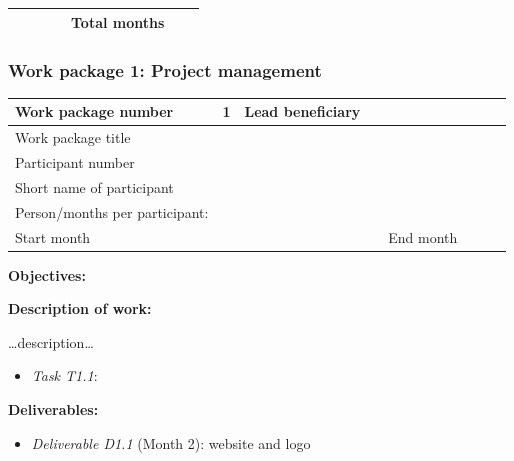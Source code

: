 \documentclass[]{article}
\providecommand{\tightlist}{%
  \setlength{\itemsep}{0pt}\setlength{\parskip}{0pt}}
\begin{document}
\begin{longtable}[]{@{}lllllll@{}}
\begin{minipage}[t]{0.11\columnwidth}
\strut
\end{minipage} & \begin{minipage}[t]{0.13\columnwidth}\raggedright
\strut
\end{minipage} & \begin{minipage}[t]{0.14\columnwidth}\raggedright
\strut
\end{minipage} & \begin{minipage}[t]{0.19\columnwidth}\raggedright
\strut
\end{minipage} & \begin{minipage}[t]{0.09\columnwidth}\raggedright
Total months\strut
\end{minipage} & \begin{minipage}[t]{0.08\columnwidth}\raggedright
\strut
\end{minipage} & \begin{minipage}[t]{0.07\columnwidth}\raggedright
\strut
\end{minipage}\tabularnewline
\bottomrule
\end{longtable}

\hypertarget{work-package-1-project-management}{%
\subsubsection{Work package 1: Project
management}\label{work-package-1-project-management}}

\begin{longtable}[]{@{}llllllll@{}}
\toprule
Work package number & 1 & Lead beneficiary & & & & &\tabularnewline
\midrule
\endhead
Work package title & & & & & & &\tabularnewline
Participant number & & & & & & &\tabularnewline
Short name of participant & & & & & & &\tabularnewline
Person/months per participant: & & & & & & &\tabularnewline
Start month & & & & End month & & &\tabularnewline
\bottomrule
\end{longtable}

\textbf{Objectives:}

\textbf{Description of work:}

\ldots{}description\ldots{}

\begin{itemize}
\tightlist
\item
  \emph{Task T1.1}:
\end{itemize}

\textbf{Deliverables:}

\begin{itemize}
\tightlist
\item
  \emph{Deliverable D1.1} (Month 2): website and logo
\end{itemize}
\end{document}
